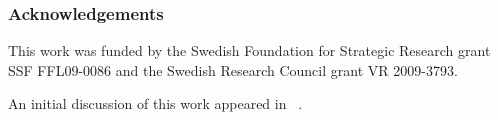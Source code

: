 \mode*

\subsubsection*{Acknowledgements}

This work was funded by the Swedish Foundation for Strategic Research grant SSF 
FFL09-0086 and the Swedish Research Council grant VR 2009-3793.

An initial discussion of this work appeared in 
~\cite{FutureProtests}.
